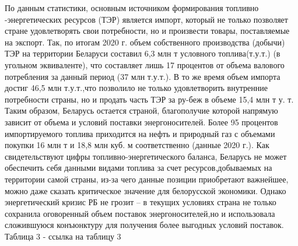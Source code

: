 \documentclass[14pt,a4paper]{article}
\begin{document}
    \par
    По данным статистики, основным источником формирования топливно\\-энергетических ресурсов (ТЭР)
    является импорт, который не только позволяет стране удовлетворять свои потребности, но и произвести товары, поставляемые на экспорт.
    Так, по итогам 2020 г. объем собственного производства (добычи) ТЭР на территории Беларуси составил 6,3 млн т условного топлива(т.у.т.) (в угольном эквиваленте), что составляет лишь 17 процентов от объема валового потребления за данный период (37 млн т.у.т.).
    В то же время объем импорта достиг 46,5 млн т.у.т.,что позволило не только удовлетворить внутренние потребности страны, но и продать часть ТЭР за ру-беж в объеме 15,4 млн т у. т.
    Таким образом, Беларусь остается страной, благополучие которой напрямую зависит от объема и условий поставки энергоносителей.
    Более 95 процентов импортируемого топлива приходится на нефть и природный газ с объемами покупки 16 млн т и 18,8 млн куб. м соответственно (данные 2020 г.).
    Как свидетельствуют цифры топливно-энергетического баланса, Беларусь не может обеспечить себя данными видами топлива за счет ресурсов,добываемых на территории самой страны, из-за чего данные позиции приобретают важнейшее, можно даже сказать критическое значение для белорусской экономики.
    Однако энергетический кризис РБ не грозит – в текущих условиях страна не только сохранила оговоренный объем поставок энергоносителей,но и использовала сложившуюся конъюнктуру для получения более выгодных условий поставок.
    Таблица 3 - ссылка на таблицу 3
\end{document}
